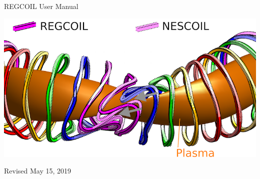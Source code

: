 \begin{center}

\vspace*{1in}

{\Huge REGCOIL User Manual}

\vspace{2in}

\centerline{\includegraphics[width=6.5in]{m20170111_01_compareNescoilToRegcoilCoils.png}}


\vspace{1.0in}

Revised May 15, 2019

\end{center}

